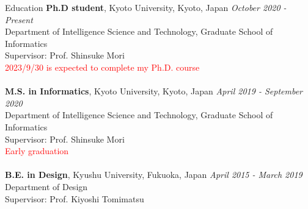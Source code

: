 \begin{rSection}{Education}
{\bf Ph.D student}, Kyoto University, Kyoto, Japan \hfill {\em October 2020 - Present}
\\ Department of Intelligence Science and Technology, Graduate School of Informatics
\\Supervisor: Prof. Shinsuke Mori\\
\textcolor{red}{2023/9/30 is expected to complete my Ph.D. course}\\
\\{\bf M.S. in Informatics}, Kyoto University, Kyoto, Japan \hfill {\em April 2019 - September 2020} 
\\ Department of Intelligence Science and Technology, Graduate School of Informatics
\\ Supervisor: Prof. Shinsuke Mori\\
\textcolor{red}{Early graduation}\\
\\{\bf B.E. in Design}, Kyushu University, Fukuoka, Japan \hfill {\em April 2015 - March 2019}
\\ Department of Design
\\ Supervisor: Prof. Kiyoshi Tomimatsu
\end{rSection}